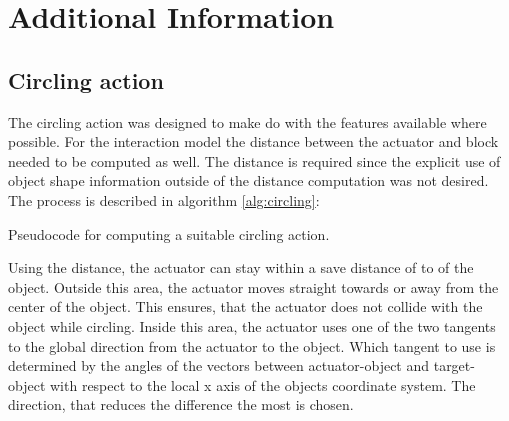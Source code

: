 \chapter{Additional Information}

\section{Circling action \label{sec:circling}}

The circling action was designed to make do with the features available where possible.
For the interaction model the distance between the actuator and block needed to be computed as well. The distance is required since the explicit use of object shape information outside of the distance computation was not desired. 
The process is described in algorithm \ref{alg:circling}:

\begin{algorithm}
\begin{algorithmic}[1]
\Statex
{} 
\Else 
\EndIf
\State {}
\Statex
{}
	\State {}
\EndFunction
\end{algorithmic}
\caption{Pseudocode for computing a suitable circling action.}
\label{alg:circling}
\end{algorithm}


Using the distance, the actuator can stay within a save distance of  to  of the object. Outside this area, the actuator moves straight towards or away from the center of the object. This ensures, that the actuator does not collide with the object while circling.
Inside this area, the actuator uses one of the two tangents to the global direction from the actuator to the object. Which tangent to use is determined by the angles of the vectors between actuator-object and target-object with respect to the local x axis of the objects coordinate system. 
The direction, that reduces the difference the most is chosen.

